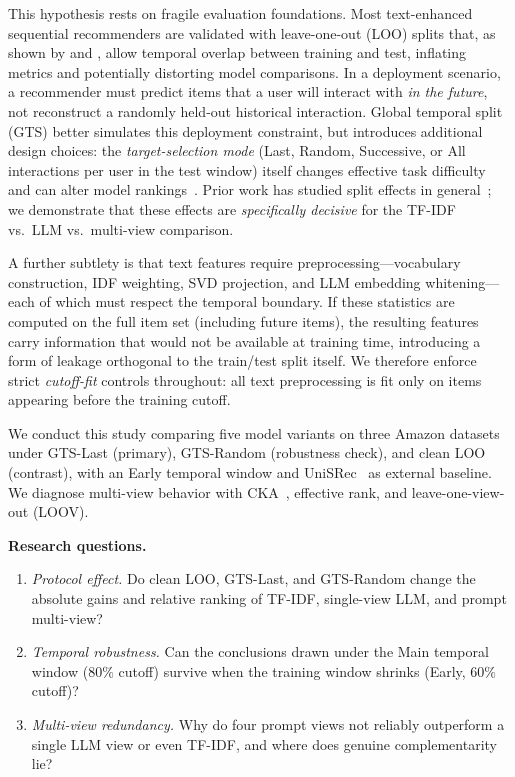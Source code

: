 \documentclass[sigconf,natbib=true,anonymous]{acmart}
\newcommand{\tfidf}{\textsc{TF-IDF}\xspace}
\newcommand{\llm}{\textsc{LLM}\xspace}
\begin{document}
This hypothesis rests on fragile evaluation foundations.
Most text-enhanced sequential recommenders are validated with leave-one-out (LOO) splits that, as shown by \citet{ji2023evaluation} and \citet{sun2023reevaluation}, allow temporal overlap between training and test, inflating metrics and potentially distorting model comparisons.
In a deployment scenario, a recommender must predict items that a user will interact with \emph{in the future}, not reconstruct a randomly held-out historical interaction.
Global temporal split (GTS) better simulates this deployment constraint, but introduces additional design choices: the \emph{target-selection mode} (Last, Random, Successive, or All interactions per user in the test window) itself changes effective task difficulty and can alter model rankings~\cite{liang2024timetosplit}.
Prior work has studied split effects in general~\cite{meng2020temporal,ji2023evaluation}; we demonstrate that these effects are \emph{specifically decisive} for the \tfidf vs.\ \llm vs.\ multi-view comparison.

A further subtlety is that text features require preprocessing---vocabulary construction, IDF weighting, SVD projection, and LLM embedding whitening---each of which must respect the temporal boundary.
If these statistics are computed on the full item set (including future items), the resulting features carry information that would not be available at training time, introducing a form of leakage orthogonal to the train/test split itself.
We therefore enforce strict \emph{cutoff-fit} controls throughout: all text preprocessing is fit only on items appearing before the training cutoff.

We conduct this study comparing five model variants on three Amazon datasets under GTS-Last (primary), GTS-Random (robustness check), and clean LOO (contrast), with an Early temporal window and UniSRec~\cite{hou2022unisrec} as external baseline.
We diagnose multi-view behavior with CKA~\cite{kornblith2019cka}, effective rank, and leave-one-view-out (LOOV).

\smallskip\noindent\textbf{Research questions.}
\begin{enumerate}[leftmargin=*,itemsep=1pt]
\item[\textbf{RQ1}] \emph{Protocol effect.}
Do clean LOO, GTS-Last, and GTS-Random change the absolute gains and relative ranking of \tfidf, single-view \llm, and prompt multi-view?
\item[\textbf{RQ2}] \emph{Temporal robustness.}
Can the conclusions drawn under the Main temporal window ($80\%$ cutoff) survive when the training window shrinks (Early, $60\%$ cutoff)?
\item[\textbf{RQ3}] \emph{Multi-view redundancy.}
Why do four prompt views not reliably outperform a single \llm view or even \tfidf, and where does genuine complementarity lie?
\end{enumerate}
\end{document}
